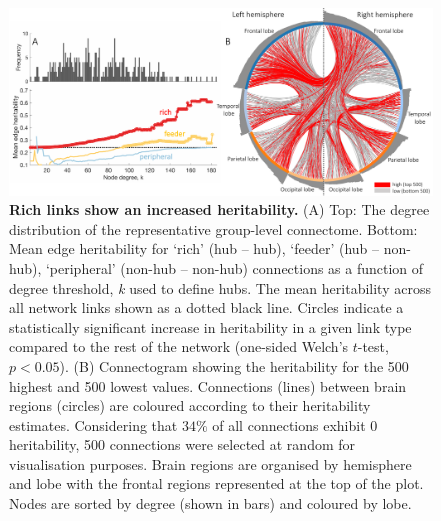 \begin{figure}[h!]
\begin{center}
\includegraphics[width=1\textwidth]{Chapter5/Ch5Fig4.pdf}%
\end{center}
\caption{\textbf{Rich links show an increased heritability.}
(A) Top: The degree distribution of the representative group-level connectome. Bottom: Mean edge heritability for `rich' (hub -- hub), `feeder' (hub -- non-hub), `peripheral' (non-hub -- non-hub) connections as a function of degree threshold, \textit{k} used to define hubs. The mean heritability across all network links shown as a dotted black line. Circles indicate a statistically significant increase in heritability in a given link type compared to the rest of the network (one-sided Welch's $t$-test, $p < 0.05$).
(B) Connectogram showing the heritability for the 500 highest and 500 lowest values. Connections (lines) between brain regions (circles) are coloured according to their heritability estimates. Considering that $34\%$ of all connections exhibit 0 heritability, 500 connections were selected at random for visualisation purposes. Brain regions are organised by hemisphere and lobe with the frontal regions represented at the top of the plot. Nodes are sorted by degree (shown in bars) and coloured by lobe.}
\label{fig:Ch5Fig4}
\end{figure}

